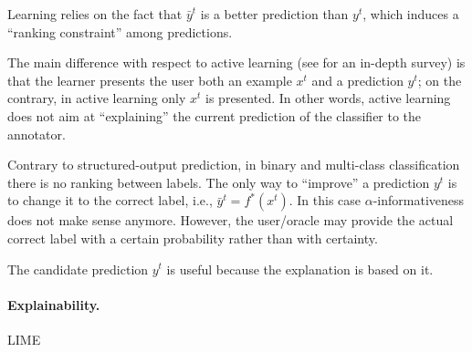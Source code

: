 \documentclass[a4paper,12pt]{article}
\begin{document}
Learning relies on
the fact that $\bar{y}^t$ is a better prediction than $y^t$, which induces a
``ranking constraint'' among predictions.

The main difference with respect to active learning (see
\cite{settles2012active} for an in-depth survey) is that the learner presents
the user both an example $x^t$ and a prediction $y^t$; on the contrary, in
active learning only $x^t$ is presented. In other words, active learning does
not aim at ``explaining'' the current prediction of the classifier to the
annotator.

Contrary to structured-output prediction, in binary and multi-class
classification there is no ranking between labels. The only way to ``improve''
a prediction $y^t$ is to change it to the correct label, i.e., $\bar{y}^t =
f^*(x^t)$. In this case $\alpha$-informativeness does not make sense anymore.
However, the user/oracle may provide the actual correct label with a certain
probability rather than with certainty.

The candidate prediction $y^t$ is useful because the explanation is based on
it.

\paragraph{Explainability.}
LIME~\cite{ribeiro2016should}
\end{document}
